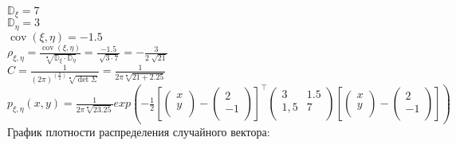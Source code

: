 \documentclass{article}
\begin{document}
$\mathbb{D}_\xi=7$\\

$\mathbb{D}_\eta=3$\\

$\mathop{\mathrm{cov}}\nolimits(\xi, \eta)=-1.5$\\

$\rho_{\xi,\eta}=\frac{\mathop{\mathrm{cov}}\nolimits(\xi, \eta)}{\sqrt[•]{\mathbb{D}_\xi\cdot\mathbb{D}_\eta}}=\frac{-1.5}{\sqrt[]{3\cdot7}}=-\frac{3}{2\sqrt[]{21}}$\\

$C=\frac{1}{(2\pi)^{\left(\frac{n}{2}\right)}\sqrt[•]{\det\Sigma}}=\frac{1}{2\pi\sqrt[•]{21+2.25}}$\\

$p_{\xi,\eta}(x,y)=\frac{1}{2\pi\sqrt[•]{23.25}}exp\left(
-\frac{1}{2}
\left[
  	\left(
  		{\begin{array}{c}
    			x\\
    			y\\
  		\end{array}}
  	\right)
-
  	\left(
  		{\begin{array}{c}
    			2\\
    			-1\\
  		\end{array}}
  	\right)
\right]^\top
\left(
	{\begin{array}{cc}
  		3 & 1.5\\
  		1,5 & 7\\
	\end{array}}
\right)
\left[
 	 \left(
  		{\begin{array}{c}
    			x\\
    			y\\
  		\end{array}}
  	\right)
-
  	\left(
  		{\begin{array}{c}
    			2\\
    			-1\\
  		\end{array}}
  	\right)
\right]
\right)$\\


График плотности распределения случайного вектора:

\begin{center}
\end{center}
\end{document}
